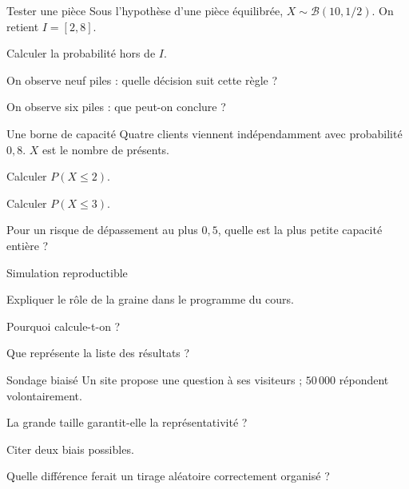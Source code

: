 \begingroup\renewcommand{\otBesoinPlace}[1]{}\begin{minipage}{\linewidth}
\begin{exercice}[2]{Tester une pièce}
Sous l’hypothèse d’une pièce équilibrée, $X\sim\mathcal B(10,1/2)$. On retient $I=[2,8]$.
\begin{questions}
\item Calculer la probabilité hors de $I$.
\item On observe neuf piles : quelle décision suit cette règle ?
\item On observe six piles : que peut-on conclure ?
\end{questions}
\end{exercice}
\begin{exercice}[2]{Une borne de capacité}
Quatre clients viennent indépendamment avec probabilité $0{,}8$. $X$ est le nombre de présents.
\begin{questions}
\item Calculer $P(X\leq2)$.
\item Calculer $P(X\leq3)$.
\item Pour un risque de dépassement au plus $0{,}5$, quelle est la plus petite capacité entière ?
\end{questions}
\end{exercice}
\begin{exercice}[2]{Simulation reproductible}

\begin{questions}
\item Expliquer le rôle de la graine dans le programme du cours.
\item Pourquoi calcule-t-on  ?
\item Que représente la liste des résultats ?
\end{questions}
\end{exercice}
\begin{exercice}[2]{Sondage biaisé}
Un site propose une question à ses visiteurs ; $50\,000$ répondent volontairement.
\begin{questions}
\item La grande taille garantit-elle la représentativité ?
\item Citer deux biais possibles.
\item Quelle différence ferait un tirage aléatoire correctement organisé ?
\end{questions}
\end{exercice}
\end{minipage}\endgroup

